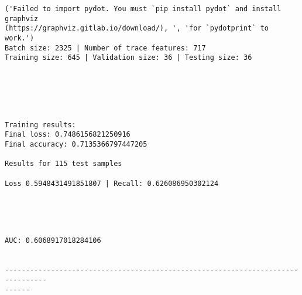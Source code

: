 \documentclass[11pt]{article}
\begin{document}
    \begin{Verbatim}[commandchars=\\\{\}]
('Failed to import pydot. You must `pip install pydot` and install graphviz
(https://graphviz.gitlab.io/download/), ', 'for `pydotprint` to work.')
Batch size: 2325 | Number of trace features: 717
Training size: 645 | Validation size: 36 | Testing size: 36
    \end{Verbatim}

    \begin{center}
    \end{center}
    { \hspace*{\fill} \\}
    
    \begin{center}
    \end{center}
    { \hspace*{\fill} \\}
    
    \begin{Verbatim}[commandchars=\\\{\}]

Training results:
Final loss: 0.7486156821250916
Final accuracy: 0.7135366797447205

Results for 115 test samples

Loss 0.5948431491851807 | Recall: 0.626086950302124



    \end{Verbatim}

    \begin{center}
    \end{center}
    { \hspace*{\fill} \\}
    
    \begin{Verbatim}[commandchars=\\\{\}]
AUC: 0.6068917018284106


--------------------------------------------------------------------------------
------


    \end{Verbatim}

    \begin{center}
    \end{center}
    { \hspace*{\fill} \\}
    
\end{document}
